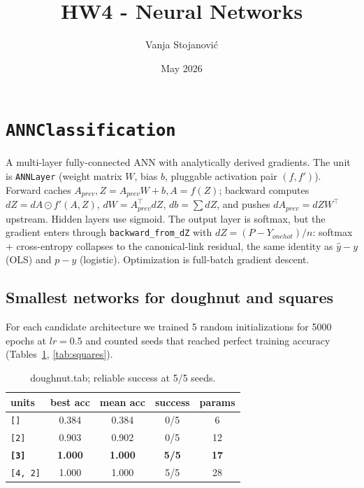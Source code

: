 \documentclass[10pt, a4paper]{article}
\title{\textbf{HW4 - Neural Networks}}
\author{Vanja Stojanovi\'c}
\date{May 2026}
\begin{document}
\maketitle

\section{\texttt{ANNClassification}}

A multi-layer fully-connected ANN with analytically derived gradients. The unit is \texttt{ANNLayer} (weight matrix \(W\), bias \(b\), pluggable activation pair \((f, f')\)). Forward caches \(A_{prev}, Z = A_{prev} W + b, A = f(Z)\); backward computes \(dZ = dA \odot f'(A, Z)\), \(dW = A_{prev}^\top dZ\), \(db = \sum dZ\), and pushes \(dA_{prev} = dZ W^\top\) upstream. Hidden layers use sigmoid. The output layer is softmax, but the gradient enters through \texttt{backward\_from\_dZ} with \(dZ = (P - Y_{onehot})/n\): softmax + cross-entropy collapses to the canonical-link residual, the same identity as \(\hat{y} - y\) (OLS) and \(p - y\) (logistic). Optimization is full-batch gradient descent.

\subsection{Smallest networks for doughnut and squares}

For each candidate architecture we trained 5 random initializations for 5000 epochs at \(lr = 0.5\) and counted seeds that reached perfect training accuracy (Tables~\ref{tab:doughnut}, \ref{tab:squares}).

\begin{table}[h]
\centering
\caption{doughnut.tab; reliable success at 5/5 seeds.}
\label{tab:doughnut}
\begin{tabular}{lcccc}
\toprule
units & best acc & mean acc & success & params \\
\midrule
\texttt{[]}      & 0.384 & 0.384 & 0/5 & 6 \\
\texttt{[2]}     & 0.903 & 0.902 & 0/5 & 12 \\
\textbf{\texttt{[3]}} & \textbf{1.000} & \textbf{1.000} & \textbf{5/5} & \textbf{17} \\
\texttt{[4, 2]}  & 1.000 & 1.000 & 5/5 & 28 \\
\bottomrule
\end{tabular}
\end{table}
\end{document}
